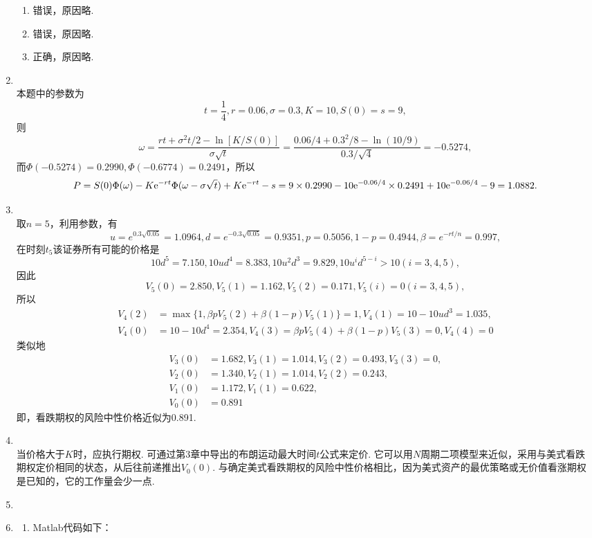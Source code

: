 \begin{enumerate}[label=\arabic{section}.\arabic*]
\begin{enumerate}[label=\alph*)]
        \item 错误，原因略.
        \item 错误，原因略.
        \item 正确，原因略.
    \end{enumerate}
    \item \sol\\
    本题中的参数为\[t=\frac{1}{4},r=0.06,\sigma=0.3,K=10,S(0)=s=9,\]
    则\[\omega=\frac{rt+\sigma^2t/2-\ln[K/S(0)]}{\sigma\sqrt{t}}=\frac{0.06/4+0.3^2/8-\ln(10/9)}{0.3/\sqrt{4}}=-0.5274,\]
    而$\Phi(-0.5274)=0.2990,\Phi(-0.6774)=0.2491$，所以
    \[P=S(0)\Phi(\omega)-K\mathrm{e}^{-rt}\Phi(\omega-\sigma\sqrt{t})+K\mathrm{e}^{-rt}-s=9\times0.2990-10\mathrm{e}^{-0.06/4}\times0.2491+10\mathrm{e}^{-0.06/4}-9=1.0882.\]
    \item \sol\\
    取$n=5$，利用参数，有
    \[u=e^{0.3\sqrt{0.05}}=1.0964,d=e^{-0.3\sqrt{0.05}}=0.9351,p=0.5056,1-p=0.4944,\beta=e^{-rt/n}=0.997,\]
    在时刻$t_5$该证券所有可能的价格是\[10d^5=7.150,10ud^4=8.383,10u^2d^3=9.829,10u^id^{5-i}>10(i=3,4,5),\]
    因此\[V_5(0)=2.850,V_5(1)=1.162,V_5(2)=0.171,V_5(i)=0(i=3,4,5),\]
    所以\begin{align*}
        V_4(2)&=\max\{1,\beta p V_5(2)+\beta(1-p)V_5(1)\}=1,V_4(1)=10-10ud^3=1.035,\\
        V_4(0)&=10-10d^4=2.354,V_4(3)=\beta p V_5(4)+\beta(1-p)V_5(3)=0,V_4(4)=0
    \end{align*}
    类似地
    \begin{align*}
        V_3(0)&=1.682,V_3(1)=1.014,V_3(2)=0.493,V_3(3)=0,\\
        V_2(0)&=1.340,V_2(1)=1.014,V_2(2)=0.243,\\
        V_1(0)&=1.172,V_1(1)=0.622,\\
        V_0(0)&=0.891
    \end{align*}
    即，看跌期权的风险中性价格近似为0.891.
    \item \sol\\ 当价格大于$K$时，应执行期权. 可通过第3章中导出的布朗运动最大时间$t$公式来定价. 它可以用$N$周期二项模型来近似，采用与美式看跌期权定价相同的状态，从后往前递推出$V_0(0)$. 与确定美式看跌期权的风险中性价格相比，因为美式资产的最优策略或无价值看涨期权是已知的，它的工作量会少一点.
    \item \omitted
    \item \sol
    \begin{enumerate}
        \item Matlab代码如下：
        \begin{lstlisting}

\end{lstlisting}
\end{enumerate}
\end{enumerate}
